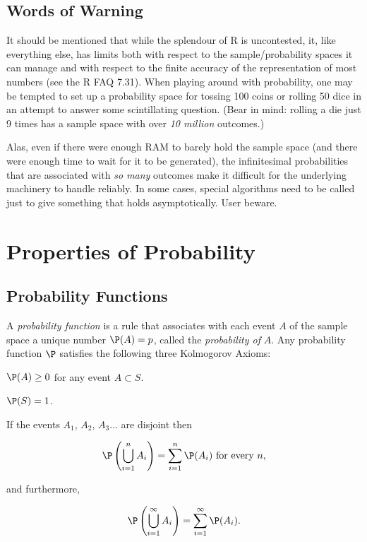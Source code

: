 \documentclass[captions=tableheading]{scrbook}
\begin{document}
\subsection{Words of Warning}
\label{sec-4-3-5}


It should be mentioned that while the splendour of \textsf{R} is uncontested,  it, like everything else, has limits both with respect to the sample/probability spaces it can manage and with respect to the finite accuracy of the representation of most numbers (see the \textsf{R} FAQ 7.31). When playing around with probability, one may be tempted to set up a probability space for tossing 100 coins or rolling 50 dice in an attempt to answer some scintillating question. (Bear in mind: rolling a die just 9 times has a sample space with over \emph{10 million} outcomes.)

Alas, even if there were enough RAM to barely hold the sample space (and there were enough time to wait for it to be generated), the infinitesimal probabilities that are associated with \emph{so many} outcomes make it difficult for the underlying machinery to handle reliably. In some cases, special algorithms need to be called just to give something
that holds asymptotically. User beware.
\section{Properties of Probability}
\label{sec-4-4}

\label{sec:Properties-of-Probability}
\subsection{Probability Functions}
\label{sec-4-4-1}

\label{sub:Probability-Functions}

A \emph{probability function} is a rule that associates with each event \(A\) of the sample space a unique number \(\P(A)=p\), called the \emph{probability of} \(A\). Any probability function \(\P\) satisfies the following three Kolmogorov Axioms: 

\begin{ax}
\label{ax:prob-nonnegative}\(\P(A)\geq0\) for any event \(A\subset S\).
\end{ax}

\begin{ax}
\label{ax:total-mass-one}\(\P(S)=1\).
\end{ax}

\begin{ax}
\label{ax:countable-additivity}If the events \(A_{1}\), \(A_{2}\),
\(A_{3}\)... are disjoint then

\begin{equation}
\P\left(\bigcup_{i=1}^{n}A_{i}\right)=\sum_{i=1}^{n}\P(A_{i})\mbox{ for every }n,
\end{equation}

and furthermore,

\begin{equation}
\P\left(\bigcup_{i=1}^{\infty}A_{i}\right)=\sum_{i=1}^{\infty}\P(A_{i}).
\end{equation}

\end{ax}
\end{document}
